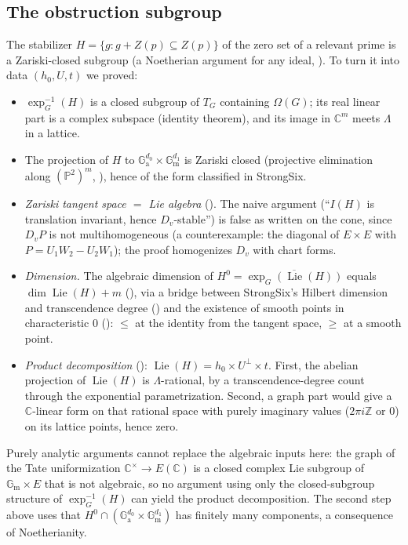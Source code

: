 \documentclass[11pt]{amsart}
\theoremstyle{definition}
\theoremstyle{remark}
\numberwithin{equation}{section}
\newcommand{\ZZ}{\mathbb{Z}}
\newcommand{\CC}{\mathbb{C}}
\newcommand{\PP}{\mathbb{P}}
\newcommand{\Ga}{\mathbb{G}_{\mathrm{a}}}
\newcommand{\Gm}{\mathbb{G}_{\mathrm{m}}}
\newcommand{\lieAlg}{\operatorname{Lie}(H)}
\begin{document}
\subsection{The obstruction subgroup}\label{sec:subgroups}
The stabilizer $H=\{g: g+Z(p)\subseteq Z(p)\}$ of the zero set of a relevant prime is a Zariski-closed
subgroup (a Noetherian argument for any ideal, ). To turn it into data
$(h_0,U,t)$ we proved:
\begin{itemize}
\item $\exp_G^{-1}(H)$ is a closed subgroup of $T_G$ containing $\Omega(G)$; its real linear part is a
complex subspace  (identity theorem), and its image in $\CC^m$ meets $\Lambda$ in a lattice.
\item The projection of $H$ to $\Ga^{d_0}\times\Gm^{d_1}$ is Zariski closed (projective elimination along
$(\PP^2)^m$, ), hence of the form classified in StrongSix.
\item \emph{Zariski tangent space $=$ Lie algebra} (). The naive argument (``$I(H)$ is
translation invariant, hence $D_v$-stable'') is false as written on the cone, since $D_vP$ is not
multihomogeneous (a counterexample: the diagonal of $E\times E$ with $P=U_1W_2-U_2W_1$); the proof
homogenizes $D_v$ with chart forms.
\item \emph{Dimension.} The algebraic dimension of $H^0=\overline{\exp_G(\lieAlg)}$ equals
$\dim\lieAlg+m$ (), via a bridge between StrongSix's Hilbert dimension and transcendence
degree () and the existence of smooth points in characteristic $0$
(): $\le$ at the identity from the tangent space, $\ge$ at a smooth point.
\item \emph{Product decomposition} (): $\lieAlg=h_0\times U^\perp\times t$. First,
the abelian projection of $\lieAlg$ is $\Lambda$-rational, by a transcendence-degree count through the
exponential parametrization. Second, a graph part would give a $\CC$-linear form on that rational space
with purely imaginary values ($2\pi i\ZZ$ or $0$) on its lattice points, hence zero.
\end{itemize}
Purely analytic arguments cannot replace the algebraic inputs here: the graph of the Tate
uniformization $\CC^\times\to E(\CC)$ is a closed complex Lie subgroup of $\Gm\times E$ that is not algebraic,
so no argument using only the closed-subgroup structure of $\exp_G^{-1}(H)$ can yield the product
decomposition. The second step above uses that $H^0\cap(\Ga^{d_0}\times\Gm^{d_1})$ has finitely many
components, a consequence of Noetherianity.
\end{document}
